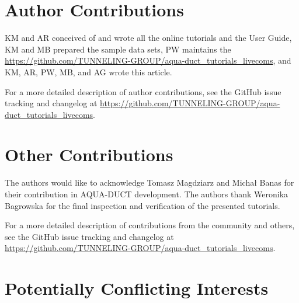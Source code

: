 \documentclass[9pt,tutorial, pubversion]{livecoms}
\newcommand{\githubrepository}{\url{https://github.com/TUNNELING-GROUP/aqua-duct_tutorials_livecoms}}  %
\begin{document}
\section{Author Contributions}
%

KM and AR conceived of and wrote all the online tutorials and the User Guide, KM and MB prepared the sample data sets, PW maintains the \githubrepository, and KM, AR, PW, MB, and AG wrote this article.

For a more detailed description of author contributions,
see the GitHub issue tracking and changelog at \githubrepository.

\section{Other Contributions}
%

The authors would like to acknowledge Tomasz Magdziarz and Michał Banas for their contribution in AQUA-DUCT development. The authors thank Weronika Bagrowska for the final inspection and verification of the presented tutorials.

For a more detailed description of contributions from the community and others, see the GitHub issue tracking and changelog at \githubrepository.

\section{Potentially Conflicting Interests}
\end{document}

